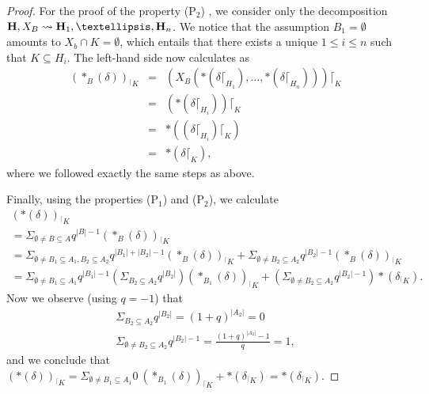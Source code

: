 \documentclass[10pt,a4paper]{amsart}
\newcommand{\hyper}[1]{{\bf #1}}
\newcommand{\inc}{\subseteq}
\newcommand{\restrconstr}[2]{{#1}_{{}^\lceil {#2}}}
\begin{document}
\begin{proof}
For the proof of  the property (P$_2$) , we consider only the decomposition $\hyper{H},X_B   \leadsto   \hyper{H}_1,\ldots,\hyper{H}_n$. We notice that the assumption $B_1=\emptyset$ amounts to $X_b\cap K=\emptyset$, which entails that there exists a unique $1\leq i\leq n$ such that $K\subseteq H_i$. The left-hand side now calculates as 
 $$\begin{array}{rcl}
\restrconstr{(\ast_B(\delta))}{K} & =&(X_ B(\ast(\delta\lceil_{H_1}),\dots,\ast(\delta\lceil_{H_n})))\lceil_{K} \\[0.1cm]
&=& (\ast (\delta\lceil_{H_i}))\lceil_K \\[0.1cm]
&=& \ast ((\delta\lceil_{H_i}) \lceil_K) \\[0.1cm]
&=& \ast (\delta\lceil_{K}),
\end{array}$$
where we followed exactly the same steps as above.  

\smallskip
 
Finally,
using the properties  (P$_1$) and  (P$_2$), we calculate
$$\begin{array}{l} \restrconstr{(\ast(\delta))}{K} \\
 =  \Sigma_{\emptyset\neq B\inc A} q^{|B|-1} \restrconstr{(\ast_B(\delta))}{K}\\
 =  \Sigma_{\emptyset\neq B_1\inc A_1,B_2\inc A_2} q^{|B_1|+|B_2|-1} \restrconstr{(\ast_B(\delta))}{K} +
\Sigma_{\emptyset\neq B_2\inc A_2} q^{|B_2|-1} \restrconstr{(\ast_B(\delta))}{K}\\
 =  \Sigma_{\emptyset\neq B_1\inc A_1} q^{|B_1|-1}(\Sigma_{B_2\inc A_2} q^{|B_2|})\restrconstr{(\ast_{B_1}(\delta))}{K} +
(\Sigma_{\emptyset\neq B_2\inc A_2} q^{|B_2|-1}) \ast(\restrconstr{\delta}{K}).
\end{array}$$
Now we observe (using $q=-1$) that 
$$\begin{array}{l}
\Sigma_{B_2\inc A_2} q^{|B_2|} = (1+q)^{|A_2|}=0\\
\Sigma_{\emptyset\neq B_2\inc A_2} q^{|B_2|-1} = \frac{(1+q)^{|A_2|}-1}{q}= 1,
\end{array}$$
and we conclude that $ \restrconstr{(\ast(\delta))}{K} = \Sigma_{\emptyset\neq B_1\inc A_1}0 \:\restrconstr{(\ast_{B_1}(\delta))}{K} +
\ast(\restrconstr{\delta}{K}) = \ast(\restrconstr{\delta}{K})$.
\end{proof}
\end{document}
